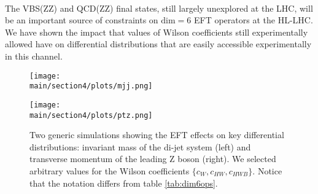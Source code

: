 \\
The VBS(ZZ) and QCD(ZZ) final states, still largely unexplored at the LHC, will be an important source of constraints on $\mathrm{dim=6}$ EFT operators at the HL-LHC. We have shown the impact that values of Wilson coefficients still experimentally allowed have on differential distributions that are easily accessible experimentally in this channel. 

% 
\begin{figure}[htbp]
  \begin{minipage}[b]{0.5\textwidth}
    \texttt{[image: \\main/section4/plots/mjj.png]}
  \end{minipage}
  \begin{minipage}[b]{0.5\textwidth}
    \texttt{[image: \\main/section4/plots/ptz.png]}
  \end{minipage}
  \caption{Two generic simulations showing the EFT effects on key differential distributions: invariant mass of the di-jet system (left) and transverse momentum of the leading Z boson (right). We selected arbitrary values for the Wilson coefficients $\lbrace c_W, c_{HW}, c_{HWB} \rbrace$. Notice that the notation differs from table \ref{tab:dim6ops}.}
  \label{fig:plots}
\end{figure}


